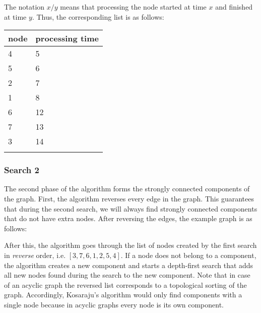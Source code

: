 The notation $x/y$ means that
processing the node started
at time $x$ and finished at time $y$.
Thus, the corresponding list is as follows:

\begin{tabular}{ll}
\\
node & processing time \\
\hline
4 & 5 \\
5 & 6 \\
2 & 7 \\
1 & 8 \\
6 & 12 \\
7 & 13 \\
3 & 14 \\
\\
\end{tabular}

\subsubsection{Search 2}

The second phase of the algorithm
forms the strongly connected components
of the graph.
First, the algorithm reverses every
edge in the graph.
This guarantees that during the second search,
we will always find strongly connected
components that do not have extra nodes.
After reversing the edges, the example graph is as follows:

\begin{center}
\end{center}

After this, the algorithm goes through
the list of nodes created by the first
search in \emph{reverse} order, i.e. $[3,7,6,1,2,5,4]$.
If a node does not belong to a component, the algorithm
creates a new component and starts a
depth-first search that adds all new nodes
found during the search to the new component.
Note that in case of an acyclic graph the
reversed list corresponds to a topological sorting
of the graph. Accordingly, Kosaraju's algorithm
would only find components with a single node
because in acyclic graphs every node is its own component.

